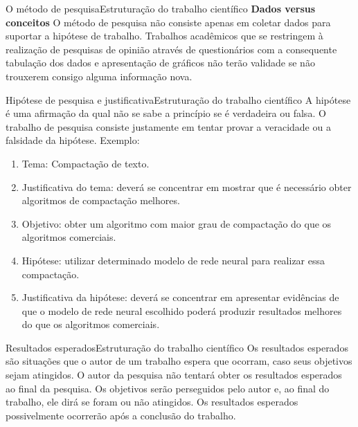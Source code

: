 \documentclass[t]{beamer}
\begin{document}

\begin{ftst}{O método de pesquisa}{Estruturação do trabalho científico}
\justifying
\textbf{Dados versus conceitos}
\vone
O método de pesquisa não consiste apenas em coletar dados para suportar a hipótese de trabalho. 
\vone
Trabalhos acadêmicos que se restringem à realização de pesquisas de opinião através de questionários com a consequente tabulação dos dados e apresentação de gráficos não terão validade se não trouxerem consigo alguma informação nova.

\end{ftst}



\begin{ftst}{Hipótese de pesquisa e justificativa}{Estruturação do trabalho científico}
\justifying
A hipótese é uma afirmação da qual não se sabe a princípio se é verdadeira ou falsa. O trabalho de pesquisa consiste justamente em tentar provar a veracidade ou a falsidade da hipótese.
\vone
Exemplo:
\begin{enumerate}
    \item Tema: Compactação de texto.
    \item Justificativa do tema: deverá se concentrar em mostrar que é necessário obter algoritmos de compactação melhores.
    \item Objetivo: obter um algoritmo com maior grau de compactação do que os algoritmos comerciais.
    \item Hipótese: utilizar determinado modelo de rede neural para realizar essa compactação.
    \item Justificativa da hipótese: deverá se concentrar em apresentar evidências de que o modelo de rede neural escolhido poderá produzir resultados melhores do que os algoritmos comerciais.

\end{enumerate}

\end{ftst}


\begin{ftst}{Resultados esperados}{Estruturação do trabalho científico}
\justifying
Os resultados esperados são situações que o autor de um trabalho espera que ocorram, caso seus objetivos sejam atingidos.
\vone
O autor da pesquisa não tentará obter os resultados esperados ao final da pesquisa.
\vone
Os objetivos serão perseguidos pelo autor e, ao final do trabalho, ele dirá se foram ou não atingidos. Os resultados esperados possivelmente ocorrerão após a conclusão do trabalho.

\end{ftst}
\end{document}
